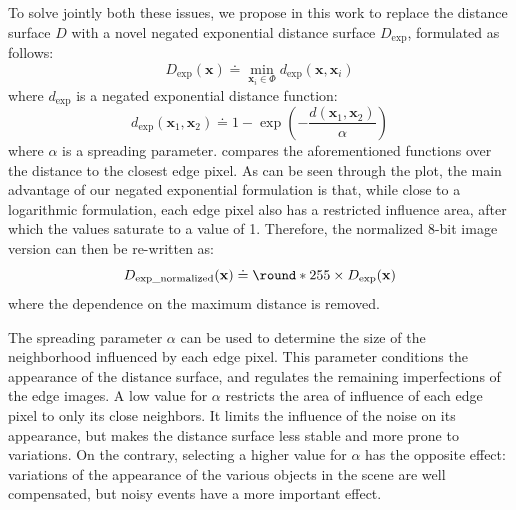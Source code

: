 To solve jointly both these issues, we propose in this work to replace the distance surface \(D\) with a novel negated exponential distance surface \(D_\text{exp}\), formulated as follows:
\begin{equation}
  D_\text{exp}(\mathbf{x}) \doteq \min_{\mathbf{x}_i \in \Phi} d_\text{exp}(\mathbf{x}, \mathbf{x}_i)
\end{equation}
where \(d_\text{exp}\) is a negated exponential distance function:
\begin{equation}\label{eq:ebof:negated_exp_dist}
  d_\text{exp}(\mathbf{x}_1, \mathbf{x}_2) \doteq 1-\exp\left({-\frac{d(\mathbf{x}_1, \mathbf{x}_2)}{\alpha}}\right)
\end{equation}
where \(\alpha \) is a spreading parameter.  compares the aforementioned functions over the distance to the closest edge pixel. As can be seen through the plot, the main advantage of our negated exponential formulation is that, while close to a logarithmic formulation, each edge pixel also has a restricted influence area, after which the values saturate to a value of 1. Therefore, the normalized 8-bit image version can then be re-written as:
\begin{equation}
  D_\text{exp\_normalized}(\mathbf{x}) \doteq \round*{255 \times D_\text{exp}(\mathbf{x})}
\end{equation}
where the dependence on the maximum distance is removed.

The spreading parameter \(\alpha \) can be used to determine the size of the neighborhood influenced by each edge pixel. This parameter conditions the appearance of the distance surface, and regulates the remaining imperfections of the edge images. A low value for \(\alpha \) restricts the area of influence of each edge pixel to only its close neighbors. It limits the influence of the noise on its appearance, but makes the distance surface less stable and more prone to variations. On the contrary, selecting a higher value for \(\alpha \) has the opposite effect: variations of the appearance of the various objects in the scene are well compensated, but noisy events have a more important effect.

